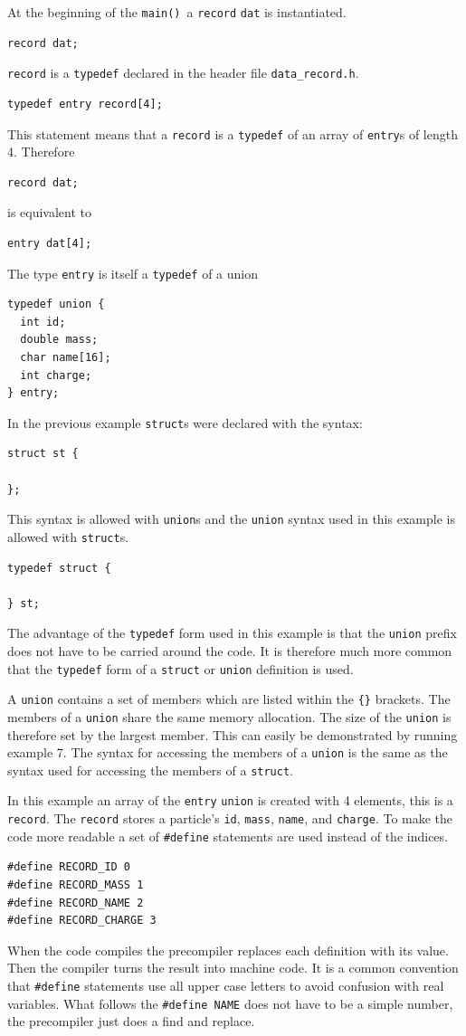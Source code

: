 \documentclass[11pt]{scrartcl}
\def\main{\texttt{main()}}
\begin{document}
At the beginning of the \main\ a \texttt{record} \texttt{dat} is
instantiated.
\begin{lstlisting}
record dat;
\end{lstlisting}
\texttt{record} is a \texttt{typedef} declared in the header file
\texttt{data\_record.h}.
\begin{lstlisting}
typedef entry record[4];
\end{lstlisting}
This statement means that a \texttt{record} is a \texttt{typedef} of
an array of \texttt{entry}s of length 4.  Therefore
\begin{lstlisting}
record dat;
\end{lstlisting}
is equivalent to
\begin{lstlisting}
entry dat[4];
\end{lstlisting}
The type \texttt{entry} is itself a \texttt{typedef} of a union
\begin{lstlisting}
typedef union {
  int id;
  double mass;
  char name[16];
  int charge;
} entry;
\end{lstlisting}
In the previous example \texttt{struct}s were declared with the syntax:
\begin{lstlisting}
struct st {

};
\end{lstlisting}
This syntax is allowed with \texttt{union}s and the \texttt{union}
syntax used in this example is allowed with \texttt{struct}s.
\begin{lstlisting}
typedef struct {

} st;
\end{lstlisting}
The advantage of the \texttt{typedef} form used in this example is
that the \texttt{union} prefix does not have to be carried around the
code.  It is therefore much more common that the \texttt{typedef} form
of a \texttt{struct} or \texttt{union} definition is used.

A \texttt{union} contains a set of members which are listed within the
\texttt{\{\}} brackets.  The members of a \texttt{union} share the same memory allocation.  The size of the \texttt{union} is therefore set by the largest member.  This can easily be demonstrated by running example 7.  The syntax for accessing the members of a \texttt{union} is the same as the syntax used for accessing the members of a \texttt{struct}.

In this example an array of the \texttt{entry} \texttt{union} is
created with 4 elements, this is a \texttt{record}.  The
\texttt{record} stores a particle's \texttt{id}, \texttt{mass},
\texttt{name}, and \texttt{charge}.  To make the code more readable a
set of \texttt{\#define} statements are used instead of the indices.
\begin{lstlisting}
#define RECORD_ID 0
#define RECORD_MASS 1
#define RECORD_NAME 2
#define RECORD_CHARGE 3
\end{lstlisting}
When the code compiles the precompiler replaces each
definition with its value.  Then the compiler turns the result into
machine code.  It is a common convention that \texttt{\#define}
statements use all upper case letters to avoid confusion with real
variables.  What follows the \texttt{\#define~NAME} does not have to
be a simple number, the precompiler just does a find and replace.
\end{document}
